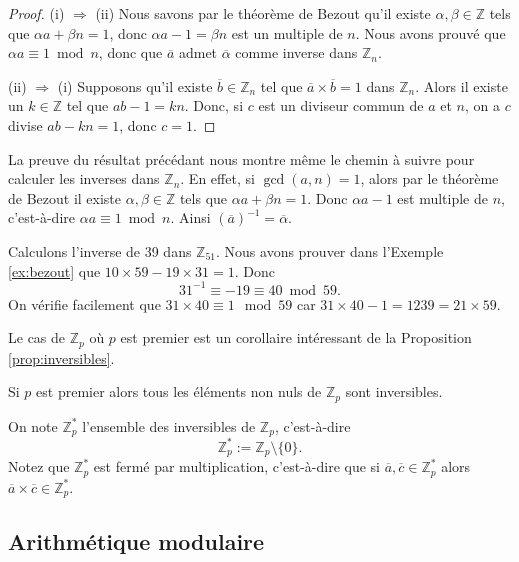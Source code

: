 \documentclass[french,course,oneside,theoremnosection]{lecture}
\newcommand{\Z}{\mathbb{Z}}
\newcommand{\iimplies}{\Rightarrow}
\begin{document}
\begin{proof}
(i) $\iimplies$ (ii) Nous savons par le théorème de Bezout qu'il existe $\alpha, \beta \in \Z$ tels que $\alpha a+\beta n =1$, donc $\alpha a -1= \beta n$ est un multiple de $n$. Nous avons prouvé que $\alpha a \equiv 1 \bmod n$, donc que $\overline{a}$ admet $\overline{\alpha}$ comme inverse dans $\Z_n$.

(ii) $\iimplies$ (i) Supposons qu'il existe $\overline{b}\in \Z_n$ tel que $\overline{a}\times\overline{b}=1$ dans $\Z_n$. Alors il existe un $k\in \Z$ tel que $ab-1=kn$. Donc, si $c$ est un diviseur commun de $a$ et $n$, on a $c$ divise $ab-kn=1$, donc $c=1$.
\end{proof}

La preuve du résultat précédant nous montre même le chemin à suivre pour calculer les inverses dans $\Z_n$. En effet, si $\gcd(a,n)=1$, alors par le théorème de Bezout il existe $\alpha, \beta \in \Z$ tels que $\alpha a + \beta n = 1$. Donc $\alpha a - 1$ est multiple de $n$, c'est-à-dire $\alpha a \equiv 1 \bmod n$. Ainsi $(\overline{a})^{-1}=\overline{\alpha}$. 

\begin{example}
Calculons l'inverse de 39 dans $\Z_{51}$. Nous avons prouver dans l'Exemple \ref{ex:bezout} que $10\times 59 -19\times 31=1$. Donc 
\[
31^{-1} \equiv -19 \equiv 40 \bmod 59. 
\]
On vérifie facilement que $31\times 40 \equiv 1 \mod 59$ car $31\times 40-1=1239=21\times 59$.
\end{example}

Le cas de $\Z_p$ où $p$ est premier est un corollaire intéressant de la Proposition \ref{prop:inversibles}.

\begin{corollary}
Si $p$ est premier alors tous les éléments non nuls de $\Z_p$ sont inversibles.
\end{corollary}

\begin{notation}
On note $\Z_p^*$ l'ensemble des inversibles de $\Z_p$, c'est-à-dire \[\Z_p^*:=\Z_p \setminus \{0\}.\] 
Notez que $\Z_p^*$ est fermé par multiplication, c'est-à-dire que si $\overline{a}, \overline{c} \in \Z_p^*$ alors $\overline{a}\times\overline{c}\in \Z_p^*$. 
\end{notation}

\subsection{Arithmétique modulaire}
\end{document}
